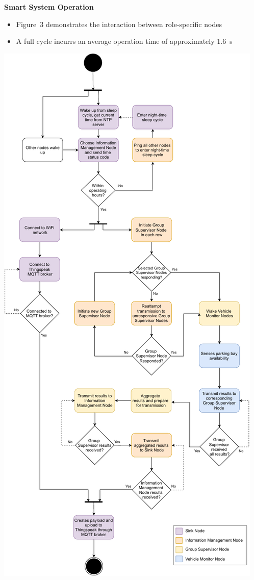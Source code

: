 \documentclass[landscape,a1paper,fontscale=0.47]{baposter} %
\newcommand{\compresslist}{ %
\setlength{\itemsep}{1pt}
\setlength{\parskip}{0pt}
\setlength{\parsep}{0pt}
}
\begin{document}
\begin{poster}
{\begin{multicols}{2}
		\textbf{Smart System Operation}
			\begin{itemize}[leftmargin=13pt]\compresslist
				\item Figure~3 demonstrates the interaction between role-specific nodes
				\item A full cycle incurrs an average operation time of approximately 1.6~s
			\end{itemize}
		
		\vspace{0.5pt}
		
		\begin{center}
			\includegraphics[width=0.9\columnwidth]{flowDiagramBIG-cropped}
		\end{center}
	

\end{multicols}}
\end{poster}
\end{document}

